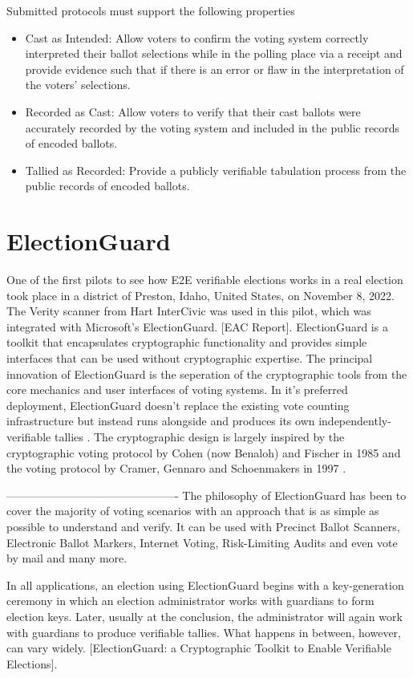 Submitted protocols must support the following properties
\begin{itemize}
      \item Cast as Intended: Allow voters to confirm the voting system correctly interpreted their ballot selections while in the polling place via a receipt and provide evidence such that if there is an error or flaw in the interpretation of the voters’ selections.
      \item Recorded as Cast: Allow voters to verify that their cast ballots were accurately recorded by the voting system and included in the public records of encoded ballots.
      \item Tallied as Recorded: Provide a publicly verifiable tabulation process from the public records of encoded ballots.
\end{itemize}

\section{ElectionGuard}

One of the first pilots to see how E2E verifiable elections works in a real election took place in a district of Preston, Idaho, United States, on November 8, 2022. The Verity scanner from Hart InterCivic was used in this pilot, which was integrated with Microsoft's ElectionGuard. [EAC Report]. ElectionGuard is a toolkit that encapsulates cryptographic functionality and provides simple interfaces that can be used without cryptographic expertise. The principal innovation of ElectionGuard is the seperation of the cryptographic tools from the core mechanics and user interfaces of voting systems. In it's preferred deployment, ElectionGuard doesn't replace the existing vote counting infrastructure but instead runs alongside and produces its own independently-verifiable tallies \cite[1-2]{eg-paper}. The cryptographic design is largely inspired by the cryptographic voting protocol by Cohen (now Benaloh) and Fischer in 1985 and the voting protocol by Cramer, Gennaro and Schoenmakers in 1997 \cite[5]{eg-paper}. 

----------------------------------------------
The philosophy of ElectionGuard has been to cover the majority of voting scenarios with an approach that is as simple as possible to understand and verify. It can be used with Precinct Ballot Scanners, Electronic Ballot Markers, Internet Voting, Risk-Limiting Audits and even vote by mail and many more.

In all applications, an election using ElectionGuard begins with a key-generation ceremony in
which an election administrator works with guardians to form election keys. Later, usually at the
conclusion, the administrator will again work with guardians to produce verifiable tallies. What
happens in between, however, can vary widely. [ElectionGuard: a Cryptographic Toolkit
to Enable Verifiable Elections].

